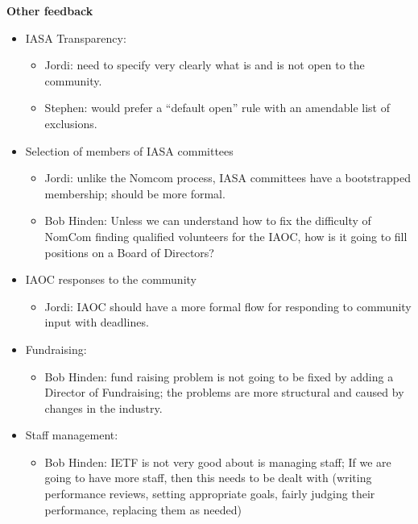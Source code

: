 \documentclass[helvetica]{seminar}
\newcommand{\heading}[1]{%
  \begin{center} 
    \large\bf 
    #1 
  \end{center} 
  \vspace{.4 in}}
\begin{document}
\begin{slide}

\heading{Other feedback}


\begin{itemize}
\item IASA Transparency:
  \begin{itemize}
  \item Jordi: need to specify very clearly what is and is not open to
    the community.
  \item Stephen: would prefer a “default open” rule with an amendable
    list of exclusions.
  \end{itemize}
\item Selection of members of IASA committees
  \begin{itemize}
  \item Jordi: unlike the Nomcom process, IASA committees have a
    bootstrapped membership; should be more formal.
  \item Bob Hinden: Unless we can understand how to fix the difficulty
    of NomCom finding qualified volunteers for the IAOC, how is it
    going to fill positions on a Board of Directors?
  \end{itemize}
\item IAOC responses to the community
  \begin{itemize}
  \item Jordi: IAOC should have a more formal flow for responding to
    community input with deadlines.
  \end{itemize}
\item Fundraising:
  \begin{itemize}
  \item Bob Hinden: fund raising problem is not going to be fixed by
    adding a Director of Fundraising; the problems are more structural
    and caused by changes in the industry.
  \end{itemize}
\item Staff management:
  \begin{itemize}
  \item Bob Hinden: IETF is not very good about is managing staff; If
    we are going to have more staff, then this needs to be dealt with
    (writing performance reviews, setting appropriate goals, fairly
    judging their performance, replacing them as needed)
  \end{itemize}
\end{itemize}

\end{slide}
\end{document}
